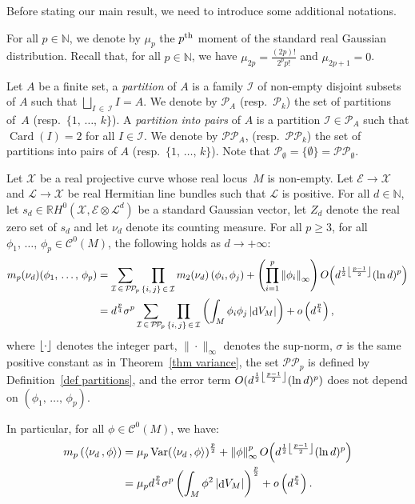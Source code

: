 \documentclass[AHL,Unicode,longabstracts,published]{cedram}
\DeclareMathOperator{\card}{Card}
\DeclareMathOperator{\dmesure}{d}
\DeclareMathOperator{\Var}{Var}
\DeclarePairedDelimiter{\floor}{\lfloor}{\rfloor}
\newcommand{\E}{\mathcal{E}}
\newcommand{\I}{\mathcal{I}}
\newcommand{\X}{\mathcal{X}}
\renewcommand{\L}{\mathcal{L}}
\newcommand{\clC}{\mathcal{C}}
\newcommand{\pa}{\mathcal{P}\!}
\newcommand{\pp}{\mathcal{P\!P}\!}
\newcommand{\N}{\mathbb{N}}
\newcommand{\R}{\mathbb{R}}
\newcommand{\norm}[1]{\left\lvert #1 \right\rvert}
\newcommand{\Norm}[1]{\left\lVert #1 \right\rVert}
\newcommand{\prsc}[2]{\left\langle #1\,, #2 \right\rangle}
\newcommand{\rmes}[1]{\norm{\dmesure\! V_{#1}}}
\newcommand{\var}[1]{\Var\!\left(#1 \right)}
\renewcommand{\H}{H^0(\X,\E \otimes \L^d)}
\renewcommand{\geq}{\geqslant}
\begin{document}
Before stating our main result, we need to introduce some additional notations.

\begin{defi}\label{def mu p}
For all $p \in \N$, we denote by $\mu_p$ the $p^{\rm th}$ moment of the standard real Gaussian distribution. Recall that, for all $p \in \N$, we have $\mu_{2p} = \frac{(2p)!}{2^p p!}$ and $\mu_{2p+1}=0$.
\end{defi}

\begin{defi}[{Partitions}]\label{def partitions}
Let $A$ be a finite set, a \emph{partition} of $A$ is a family $\I$ of non-empty disjoint subsets of $A$ such that $\bigsqcup_{I\,\in\,\I} I =A$. We denote by $\pa_A$ (resp.~$\pa_k$) the set of partitions of~$A$ (resp.~$\{1,\,\dots,\,k\}$). A \emph{partition into pairs} of $A$ is a partition $\I \in \pa_A$ such that $\card(I)=2$ for all $I \in \I$. We denote by $\pp_A$, (resp.~$\pp_k$) the set of partitions into pairs of $A$ (resp.~$\{1,\,\dots,\,k\}$). Note that $\pa_\emptyset = \{ \emptyset \} = \pp_\emptyset$.
\end{defi}

\begin{theo}\label{thm main}
Let $\X$ be a real projective curve whose real locus~$M$ is non-empty. Let $\E \to \X$ and $\L \to \X$ be real Hermitian line bundles such that $\L$ is positive. For all $d \in \N$, let $s_d \in \R\H$ be a standard Gaussian vector, let $Z_d$ denote the real zero set of $s_d$ and let $\nu_d$ denote its counting measure. For all $p \geq 3$, for all $\phi_1,\,\dots,\,\phi_p \in \clC^0(M)$, the following holds as $d \to +\infty$:
\begin{align*}
m_p(\nu_d)(\phi_1,\,\dots,\,\phi_p) &= \sum_{\I\,\in\,\pp_p} \prod_{\{i,\,j\} \,\in\,\I} m_2(\nu_d)\left(\phi_i,\phi_j\right) + \left(\prod_{i=1}^p \Norm{\phi_i}_\infty\right) O\!\left(d^{\frac{1}{2}\floor*{\frac{p-1}{2}}}(\ln d)^p\right)\\
&= d^\frac{p}{4}\sigma^p \sum_{\I\,\in\, \pp_p} \prod_{\{i,\,j\}\,\in\,\I} \left(\int_M \phi_i\phi_j \rmes{M}\right) + o\left(d^\frac{p}{4}\right),
\end{align*}
where $\floor*{\cdot}$ denotes the integer part, $\|\cdot\|_\infty$ denotes the sup-norm, $\sigma$ is the same positive constant as in Theorem~\ref{thm variance}, the set $\pp_p$ is defined by Definition~\ref{def partitions}, and the error term $O(d^{\frac{1}{2}\floor*{\frac{p-1}{2}}}(\ln d)^p)$ does not depend on $(\phi_1,\,\dots,\,\phi_p)$.

In particular, for all $\phi \in \clC^0(M)$, we have:
\begin{align*}
m_p\left(\prsc{\nu_d}{\phi}\right) &= \mu_p \var{\prsc{\nu_d}{\phi}}^\frac{p}{2} + \Norm{\phi}_\infty^p O\!\left(d^{\frac{1}{2}\floor*{\frac{p-1}{2}}}(\ln d)^p\right)\\
&= \mu_p d^\frac{p}{4}\sigma^p \left(\int_M \phi^2 \rmes{M}\right)^\frac{p}{2} + o\left(d^\frac{p}{4}\right).
\end{align*}
\end{theo}
\end{document}
